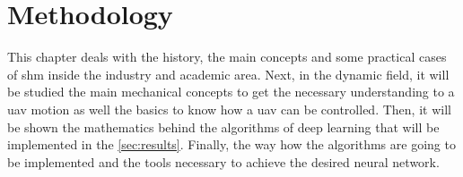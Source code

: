 \chapter{Methodology}\label{sec:methodology}

This chapter deals with the history, the main concepts and some practical cases of \gls*{shm} inside the industry and academic area. 
Next, in the dynamic field, it will be studied the main mechanical concepts to get the necessary understanding to a \gls*{uav} motion as well the basics to know how a \gls*{uav} can be controlled.
Then, it will be shown the mathematics behind the algorithms of deep learning that will be implemented in the \cref{sec:results}. 
Finally, the way how the algorithms are going to be implemented and the tools necessary to achieve the desired neural network.